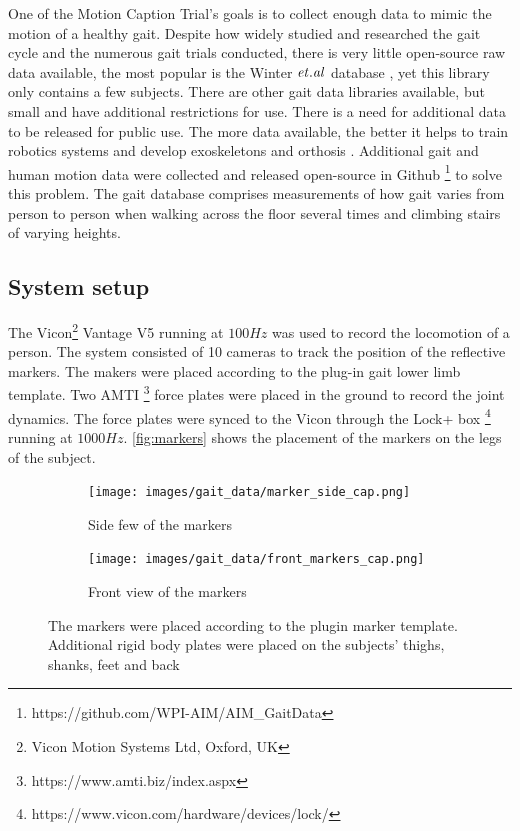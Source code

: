 One of the Motion Caption Trial's goals is to collect enough data to mimic the motion of a healthy gait.  Despite how widely studied and researched the gait cycle and the numerous gait trials conducted, there is very little open-source raw data available, the most popular is the Winter $\it{et. al}$ database \cite{winter1991biomechanics}, yet this library only contains a few subjects. There are other gait data libraries available, but small and have additional restrictions for use. There is a need for additional data to be released for public use. The more data available, the better it helps to train robotics systems and develop exoskeletons and orthosis \cite{moore2015elaborate}. Additional gait and human motion data were collected and released open-source in Github \footnote{https://github.com/WPI-AIM/AIM\_GaitData} to solve this problem. The gait database comprises measurements of how gait varies from person to person when walking across the floor several times and climbing stairs of varying heights. 


\subsection{System setup}
\label{sec:setup}
The Vicon\footnote{Vicon Motion Systems Ltd, Oxford, UK}  Vantage V5 running at $100Hz$ was used to record the locomotion of a person. The system consisted of 10 cameras to track the position of the reflective markers. The makers were placed according to the plug-in gait lower limb template. Two AMTI \footnote{https://www.amti.biz/index.aspx} force plates were placed in the ground to record the joint dynamics. The force plates were synced to the Vicon through the Lock+ box \footnote{https://www.vicon.com/hardware/devices/lock/} running at $1000Hz$. \autoref{fig:markers} shows the placement of the markers on the legs of the subject. 



\begin{figure}
\centering 
\begin{subfigure}{0.4\linewidth} 
  \centering 
  \texttt{[image: images/gait\_data/marker\_side\_cap.png]} 
  \caption[Side Marker Placement]{Side few of the markers} 
  \label{fig:markers_side} 
\end{subfigure} 
%
\begin{subfigure}{0.4\linewidth} 
  \centering 
  \texttt{[image: images/gait\_data/front\_markers\_cap.png]} 
  \caption[Front Marker Placement]{Front view of the markers} 
  \label{fig:markers_front} 
\end{subfigure} 
\caption[Marker Placement]{The markers were placed according to the plugin marker template. Additional rigid body plates were placed on the subjects' thighs, shanks, feet and back} 
\label{fig:markers} 

\end{figure} 

